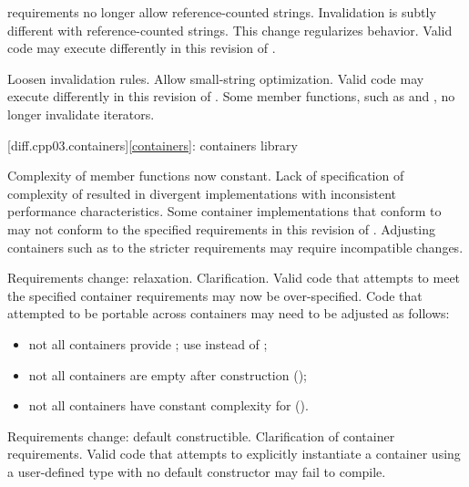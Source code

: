\change
{} requirements no longer allow reference-counted
strings.
\rationale
Invalidation is subtly different with reference-counted strings.
This change regularizes behavior.
\effect
Valid \CppIII{} code may execute differently in this revision of \Cpp{}.

\change
Loosen  invalidation rules.
\rationale
Allow small-string optimization.
\effect
Valid \CppIII{} code may execute differently in this revision of \Cpp{}.
Some  member functions, such as  and ,
no longer invalidate iterators.

[diff.cpp03.containers]{\ref{containers}: containers library}

\change
Complexity of  member functions now constant.
\rationale
Lack of specification of complexity of  resulted in
divergent implementations with inconsistent performance characteristics.
\effect
Some container implementations that conform to \CppIII{} may not conform to the
specified  requirements in this revision of \Cpp{}. Adjusting
containers such as  to the stricter requirements may require
incompatible changes.

\change
Requirements change: relaxation.
\rationale
Clarification.
\effect
Valid \CppIII{} code that attempts to meet the specified container requirements
may now be over-specified. Code that attempted to be portable across containers
may need to be adjusted as follows:
\begin{itemize}
\item not all containers provide ; use  instead
of ;
\item not all containers are empty after construction ();
\item not all containers have constant complexity for  ().
\end{itemize}

\change
Requirements change: default constructible.
\rationale
Clarification of container requirements.
\effect
Valid \CppIII{} code that attempts to explicitly instantiate a container using
a user-defined type with no default constructor may fail to compile.

